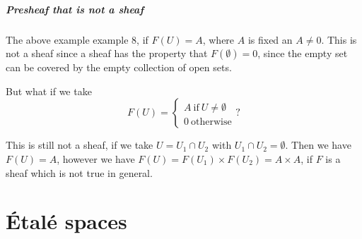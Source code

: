 \subparagraph{Presheaf that is not a sheaf}%
\label{subp:PresheafNotSheaf}
The above example example $8$, if $F(U) = A$, where  $A$ is fixed an  $A\neq 0$. This is not a sheaf since a sheaf has the property that $F(\emptyset) = 0$, since the empty set can be covered by the empty collection of open sets.

But what if we take
\begin{equation*}
    F(U) = \begin{cases}
    A \  \text{if} \ U\neq \emptyset\\
    0  \ \text{otherwise}
\end{cases}?
\end{equation*}

This is still not a sheaf, if we take $U = U_1\cap U_2$ with  $U_1\cap U_2 = \emptyset$. Then we have  $F(U) = A$, however we have  $F(U) = F(U_1)\times F(U_2) = A\times A$, if  $F$ is a sheaf which is not true in general.

\section{Étalé spaces}

